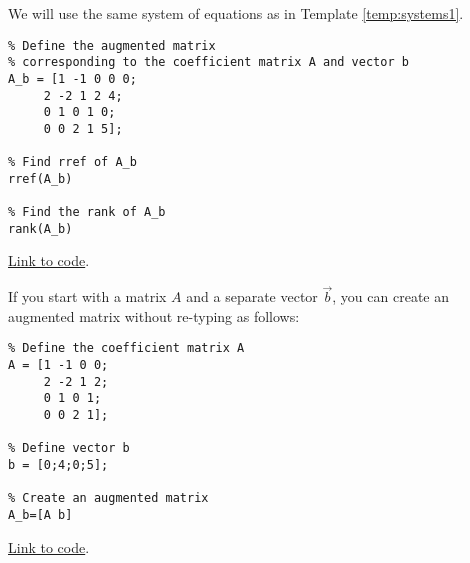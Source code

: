 \documentclass{ximera}
\begin{document}
\begin{template}\label{temp:rref}
We will use the same system of equations as in Template \ref{temp:systems1}.
    \begin{verbatim}
% Define the augmented matrix 
% corresponding to the coefficient matrix A and vector b
A_b = [1 -1 0 0 0;
     2 -2 1 2 4;
     0 1 0 1 0;
     0 0 2 1 5];
     
% Find rref of A_b
rref(A_b)

% Find the rank of A_b
rank(A_b)
    \end{verbatim}

\href{https://sagecell.sagemath.org/?z=eJxFjsEKwjAMhu-FvsN_Gehh0A49iYfB8CVEpOvSWWSt1Co-vumkmBCS_-cjSYOBnA-EfCOY17xQyDRhMTn5D2xMiZ6PGCYfZuS4UjaSc956JivXw4QJb7I5JoxS9NcRR5w1Wg1V8iAFSnRoO2huu-oo6F_9DYXC7C_VkaLByfMBfsYhOvB6KYrY8LSVgoUJ91V8ASwdNw8=&lang=octave&interacts=eJyLjgUAARUAuQ==}{Link to code}.    

\begin{remark}
    If you start with a matrix $A$ and a separate vector $\vec{b}$, you can create an augmented matrix without re-typing as follows:
    \begin{verbatim}
% Define the coefficient matrix A
A = [1 -1 0 0;
     2 -2 1 2;
     0 1 0 1;
     0 0 2 1];

% Define vector b
b = [0;4;0;5];

% Create an augmented matrix
A_b=[A b]
    \end{verbatim}

\href{https://sagecell.sagemath.org/?z=eJxFjrEKAyEQRHvBf5jmyoNVkkqukOQvjiOoWROL80BMyOdHIZLtHjvMvAlXjikz6pMRDo4xhcS5Yne1pA-sFBYLVoVZgUBGCvTTmDUU9GBCf6s_UouorbEU09h4c6hHgZfC904yJ0PmPEKXwq4yXIZ7PfbmwPefRXO4-WW18NsXtMsrmQ==&lang=octave&interacts=eJyLjgUAARUAuQ==}{Link to code}.
    
\end{remark}
\end{template}



  
\end{document}
